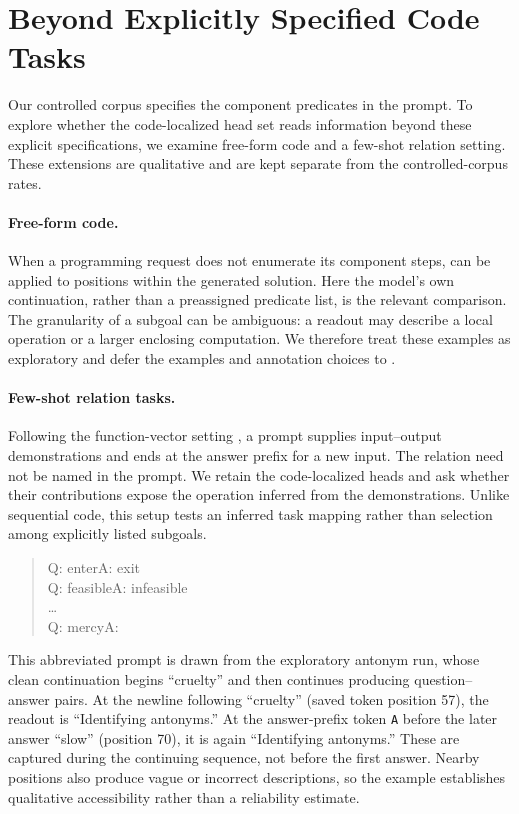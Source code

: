 \section{Beyond Explicitly Specified Code Tasks}
\label{sec:generalization}
\label{sec:steer:noncode}
Our controlled corpus specifies the component predicates in the prompt. To explore whether the code-localized head set reads information beyond these explicit specifications, we examine free-form code and a few-shot relation setting. These extensions are qualitative and are kept separate from the controlled-corpus rates.

\paragraph{Free-form code.}
When a programming request does not enumerate its component steps, \goalscope can be applied to positions within the generated solution. Here the model's own continuation, rather than a preassigned predicate list, is the relevant comparison. The granularity of a subgoal can be ambiguous: a readout may describe a local operation or a larger enclosing computation. We therefore treat these examples as exploratory and defer the examples and annotation choices to .

\paragraph{Few-shot relation tasks.}
Following the function-vector setting \citep{todd2024function}, a prompt supplies input--output demonstrations and ends at the answer prefix for a new input. The relation need not be named in the prompt. We retain the code-localized heads and ask whether their contributions expose the operation inferred from the demonstrations. Unlike sequential code, this setup tests an inferred task mapping rather than selection among explicitly listed subgoals.

\begin{quote}\small\ttfamily
Q: enter\quad A: exit\\
Q: feasible\quad A: infeasible\\
\ldots\\
Q: mercy\quad A:
\end{quote}
This abbreviated prompt is drawn from the exploratory antonym run, whose clean continuation begins ``cruelty'' and then continues producing question--answer pairs. At the newline following ``cruelty'' (saved token position 57), the readout is ``Identifying antonyms.'' At the answer-prefix token \texttt{A} before the later answer ``slow'' (position 70), it is again ``Identifying antonyms.'' These are captured during the continuing sequence, not before the first answer. Nearby positions also produce vague or incorrect descriptions, so the example establishes qualitative accessibility rather than a reliability estimate.

